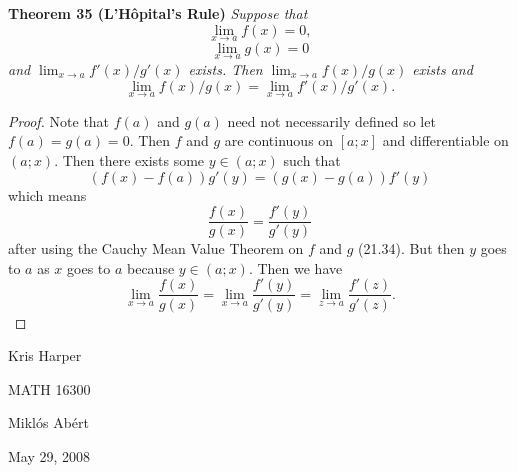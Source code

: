 \documentclass{article}
\begin{document}
\begin{flushleft}
\textbf{Theorem 35 (L'H\^{o}pital's Rule)}
\textsl{Suppose that
\[
\lim_{x \rightarrow a} f(x) = 0,
\]
\[
\lim_{x \rightarrow a} g(x) = 0
\]
and $\lim_{x \rightarrow a} f'(x)/g'(x)$ exists. Then $\lim_{x \rightarrow a} f(x)/g(x)$ exists and
\[
\lim_{x \rightarrow a} f(x)/g(x) = \lim_{x \rightarrow a} f'(x)/g'(x).
\]}
\begin{proof}
Note that $f(a)$ and $g(a)$ need not necessarily defined so let $f(a) = g(a) = 0$. Then $f$ and $g$ are continuous on $[a;x]$ and differentiable on $(a;x)$. Then there exists some $y \in (a;x)$ such that
\[
(f(x) - f(a)) g'(y) = (g(x) - g(a)) f'(y)
\]
which means
\[
\frac{f(x)}{g(x)} = \frac{f'(y)}{g'(y)}
\]
after using the Cauchy Mean Value Theorem on $f$ and $g$ (21.34). But then $y$ goes to $a$ as $x$ goes to $a$ because $y \in (a;x)$. Then we have
\[
\lim_{x \rightarrow a} \frac{f(x)}{g(x)} = \lim_{x \rightarrow a} \frac{f'(y)}{g'(y)} = \lim_{z \rightarrow a} \frac{f'(z)}{g'(z)}.
\]
\end{proof}

\end{flushleft}

\newpage

\begin{flushright}
Kris Harper

MATH 16300

Mikl\'{o}s Ab\'{e}rt

May 29, 2008
\end{flushright}
\end{document}
